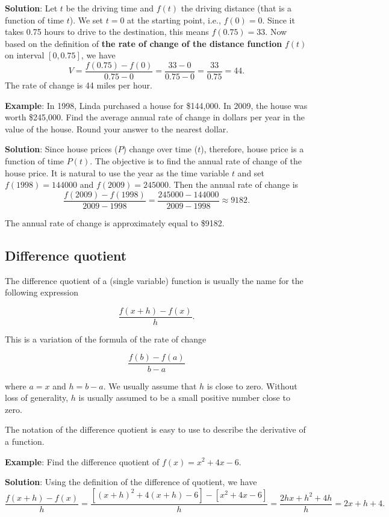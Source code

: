 \documentclass[
]{book}
\begin{document}
\textbf{Solution}: Let \(t\) be the driving time and \(f(t)\) the driving distance (that is a function of time \(t\)). We set \(t=0\) at the starting point, i.e., \(f(0)=0\). Since it takes 0.75 hours to drive to the destination, this means \(f(0.75) = 33\). Now based on the definition of \textbf{the rate of change of the distance function} \(f(t)\) on interval \([0, 0.75]\), we have \[
V = \frac{f(0.75) - f(0)}{0.75-0} = \frac{33-0}{0.75-0} = \frac{33}{0.75} = 44.
\] The rate of change is 44 miles per hour.

\textbf{Example}: In 1998, Linda purchased a house for \$144,000. In 2009, the house was worth \$245,000. Find the average annual rate of change in dollars per year in the value of the house. Round your answer to the nearest dollar.

\textbf{Solution}: Since house prices (\(P\)) change over time (\(t\)), therefore, house price is a function of time \(P(t)\). The objective is to find the annual rate of change of the house price. It is natural to use the year as the time variable \(t\) and set \(f(1998) = 144000\) and \(f(2009) = 245000\). Then the annual rate of change is \[
\frac{f(2009) - f(1998)}{2009 - 1998} = \frac{245000-144000}{2009-1998} \approx 9182.
\]

The annual rate of change is approximately equal to \$9182.

\hypertarget{difference-quotient}{%
\subsection{Difference quotient}\label{difference-quotient}}

The difference quotient of a (single variable) function is usually the name for the following expression

\[
\frac{f(x+h)-f(x)}{h}.
\]

This is a variation of the formula of the rate of change

\[
\frac{f(b)-f(a)}{b -a}
\]

where \(a = x\) and \(h = b -a\). We usually assume that \(h\) is close to zero. Without loss of generality, \(h\) is usually assumed to be a small positive number close to zero.

The notation of the difference quotient is easy to use to describe the derivative of a function.

\textbf{Example}: Find the difference quotient of \(f(x) = x^2 + 4x -6\).

\textbf{Solution}: Using the definition of the difference of quotient, we have
\[
\frac{f(x+h)-f(x)}{h} = \frac{[(x+h)^2 + 4(x+h) -6]-[x^2+4x-6]}{h}=\frac{2hx+h^2+4h}{h}=2x+h+4.
\]
\end{document}
